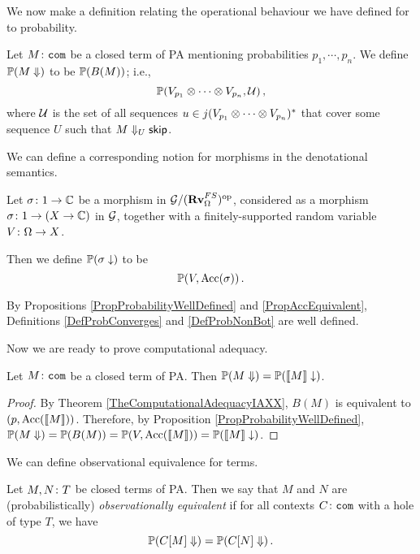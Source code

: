 We now make a definition relating the operational behaviour we have defined for \IAXX to probability.

\begin{definition}
  Let $M\colon {\mathtt{com}}$ be a closed term of PA mentioning probabilities $p_1,\cdots,p_n$.
  We define $\mathbb{P}(M\Downarrow)$ to be $\mathbb{P}(B(M))$; i.e.,
  \[
    \mathbb{P}(V_{p_1}\otimes \cdots \otimes V_{p_n},\mathcal U)\,,
    \]
  where $\mathcal U$ is the set of all sequences $u\in j(V_{p_1}\otimes \cdots \otimes V_{p_n})^*$ that cover some sequence $U$ such that $M\Downarrow_U{\mathsf{skip}}$.
  \label{DefProbConverges}
\end{definition}

We can define a corresponding notion for morphisms in the denotational semantics.

\begin{definition}
  Let $\sigma \colon 1 \to \mathbb{C}$ be a morphism in $\mathcal G/({\normalfont\textbf{Rv}}_\Omega^{FS})^{\mathrm{op}}$, considered as a morphism $\sigma \colon 1 \to (X \to \mathbb{C})$ in $\mathcal G$, together with a finitely-supported random variable $V \colon \Omega \to X$.  

  Then we define $\mathbb{P}(\sigma\downarrow)$ to be
  \[
    \mathbb{P}(V, \operatorname{Acc}(\sigma))\,.
    \]
  \label{DefProbNonBot}
\end{definition}

\begin{remark}
  By Propositions \ref{PropProbabilityWellDefined} and \ref{PropAccEquivalent}, Definitions \ref{DefProbConverges} and \ref{DefProbNonBot} are well defined.
\end{remark}

Now we are ready to prove computational adequacy.

\begin{proposition}
  Let $M\colon {\mathtt{com}}$ be a closed term of PA.  
  Then $\mathbb{P}(M\Downarrow) = \mathbb{P}(\left\llbracket M\right\rrbracket \downarrow)$.
  \label{PropComputationalAdequacyPa}
\end{proposition}
\begin{proof}
  By Theorem \ref{TheComputationalAdequacyIAXX}, $B(M)$ is equivalent to $(p,\operatorname{Acc}(\left\llbracket M\right\rrbracket))$.  
  Therefore, by Proposition \ref{PropProbabilityWellDefined}, $\mathbb{P}(M\Downarrow) = \mathbb{P}(B(M)) = \mathbb{P}(V,\operatorname{Acc}(\left\llbracket M\right\rrbracket)) = \mathbb{P}(\left\llbracket M\right\rrbracket\downarrow)$.
\end{proof}

We can define observational equivalence for terms.

\begin{definition}
  Let $M,N\colon T$ be closed terms of PA.  
  Then we say that $M$ and $N$ are (probabilistically) \emph{observationally equivalent} if for all contexts $C\colon {\mathtt{com}}$ with a hole of type $T$, we have
  \[
    \mathbb{P}(C[M]\Downarrow) = \mathbb{P}(C[N]\Downarrow)\,.
    \]
\end{definition}

